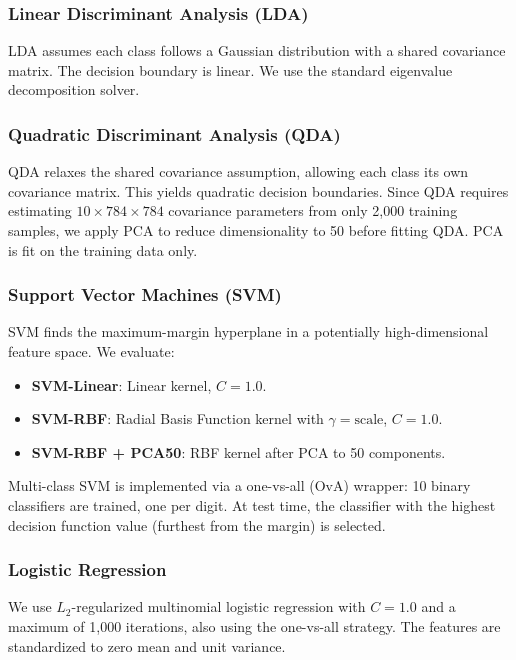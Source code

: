 \documentclass[11pt,a4paper,twocolumn]{article}
\begin{document}
\subsubsection{Linear Discriminant Analysis (LDA)}
LDA assumes each class follows a Gaussian distribution with a shared covariance matrix. The decision boundary is linear. We use the standard eigenvalue decomposition solver.

\subsubsection{Quadratic Discriminant Analysis (QDA)}
QDA relaxes the shared covariance assumption, allowing each class its own covariance matrix. This yields quadratic decision boundaries. Since QDA requires estimating $10 \times 784 \times 784$ covariance parameters from only 2,000 training samples, we apply PCA to reduce dimensionality to 50 before fitting QDA. PCA is fit on the training data only.

\subsubsection{Support Vector Machines (SVM)}
SVM finds the maximum-margin hyperplane in a potentially high-dimensional feature space. We evaluate:
\begin{itemize}[noitemsep]
    \item \textbf{SVM-Linear}: Linear kernel, $C = 1.0$.
    \item \textbf{SVM-RBF}: Radial Basis Function kernel with $\gamma = \text{scale}$, $C = 1.0$.
    \item \textbf{SVM-RBF + PCA50}: RBF kernel after PCA to 50 components.
\end{itemize}
Multi-class SVM is implemented via a one-vs-all (OvA) wrapper: 10 binary classifiers are trained, one per digit. At test time, the classifier with the highest decision function value (furthest from the margin) is selected.

\subsubsection{Logistic Regression}
We use $L_2$-regularized multinomial logistic regression with $C = 1.0$ and a maximum of 1,000 iterations, also using the one-vs-all strategy. The features are standardized to zero mean and unit variance.
\end{document}
